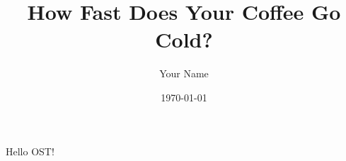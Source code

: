 \documentclass[a4paper,11pt]{article}
\title{How Fast Does Your Coffee Go Cold?}
\author{Your Name}
\date{\today}
\begin{document}
\maketitle

Hello OST!
\end{document}
